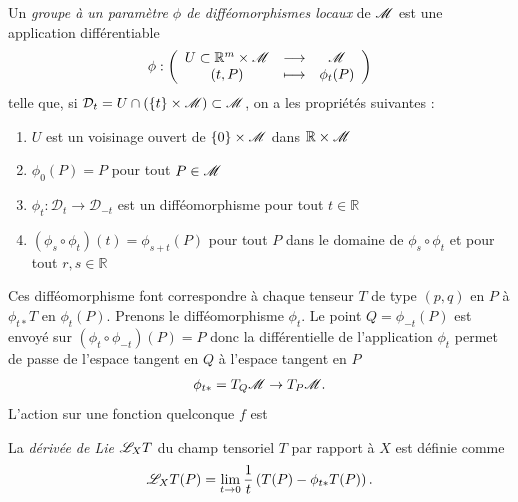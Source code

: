\documentclass[a4paper,11pt]{report}
\begin{document}
            \begin{defn}
                Un \textit{groupe à un paramètre $\phi$ de difféomorphismes locaux} de $\mathscr{M}$ est une application différentiable
                \begin{equation}
                \phi:\left(
                \begin{array}{ccc}
                    U\subset\mathbb{R}^m\times\mathscr{M} & \longrightarrow & \mathscr{M} \\
                    (t,P) & \longmapsto & \phi_t(P)
                \end{array}
                \right)
                \end{equation}
                telle que, si $\mathcal{D}_t=U\cap(\{t\}\times\mathscr{M})\subset\mathscr{M}$, on a les propriétés suivantes :
                \begin{enumerate}[label = \textit{\roman*)}]
                    \item $U$ est un voisinage ouvert de $\{0\}\times\mathscr{M}$ dans $\mathbb{R}\times\mathscr{M}$
                    \item $\phi_0(P)=P$ pour tout $P\in\mathscr{M}$
                    \item $\phi_t:\mathcal{D}_t\to\mathcal{D}_{-t}$ est un difféomorphisme pour tout $t\in\mathbb{R}$
                    \item $(\phi_s\circ\phi_t)(t) = \phi_{s+t}(P)$ pour tout $P$ dans le domaine de $\phi_s\circ\phi_t$ et pour tout $r,s\in\mathbb{R}$
                \end{enumerate}
            \end{defn}
            
            Ces difféomorphisme font correspondre à chaque tenseur $T$ de type $(p,q)$ en $P$ à $\phi_{t*}T$ en $\phi_t(P)$. Prenons le difféomorphisme $\phi_t$. Le point $Q = \phi_{-t}(P)$ est envoyé sur $(\phi_{t}\circ\phi_{-t})(P) = P$ donc la différentielle de l'application $\phi_t$ permet de passe de l'espace tangent en $Q$ à l'espace tangent en $P$
            \begin{equation}
                \phi_{t*}=T_Q\mathscr{M}\to T_P\mathscr{M}.
            \end{equation}
            L'action sur une fonction quelconque $f$ est 
            
            \comp
            
            \begin{defn}
                La \textit{dérivée de Lie} $\mathscr{L}_X T$ du champ tensoriel $T$ par rapport à $X$ est définie comme
                \begin{equation}
                    \mathscr{L}_X T (P) = \lim\limits_{t\to0} \frac{1}{t}\left(T(P)-\phi_{t*}T(P) \right).
                \end{equation}
            \end{defn}
            
\end{document}
